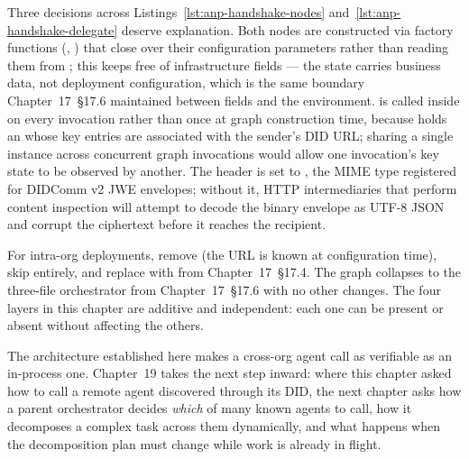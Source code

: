 Three decisions across Listings~\ref{lst:anp-handshake-nodes}
and~\ref{lst:anp-handshake-delegate} deserve explanation.
Both nodes are constructed via factory functions (,
) that close over their configuration parameters
rather than reading them from ; this keeps
 free of infrastructure fields --- the state carries
business data, not deployment configuration, which is the same boundary
Chapter~17~\S17.6 maintained between  fields and
the environment.  is called inside
 on every invocation rather than once at graph
construction time, because  holds an
 whose key entries are associated with the
sender's DID URL; sharing a single instance across concurrent graph
invocations would allow one invocation's key state to be observed by
another. The  header is set to
, the MIME type registered for
DIDComm v2 JWE envelopes; without it, HTTP intermediaries that perform
content inspection will attempt to decode the binary envelope as UTF-8
JSON and corrupt the ciphertext before it reaches the recipient.

\begin{notebox}
For intra-org deployments, remove  (the URL is
known at configuration time), skip  entirely,
and replace  with  from
Chapter~17~\S17.4. The graph collapses to the three-file orchestrator
from Chapter~17~\S17.6 with no other changes. The four layers in this
chapter are additive and independent: each one can be present or absent
without affecting the others.
\end{notebox}

The architecture established here makes a cross-org agent call as
verifiable as an in-process one. Chapter~19 takes the next step inward:
where this chapter asked how to call a remote agent discovered through its
DID, the next chapter asks how a parent orchestrator decides \emph{which}
of many known agents to call, how it decomposes a complex task across them
dynamically, and what happens when the decomposition plan must change while
work is already in flight.
